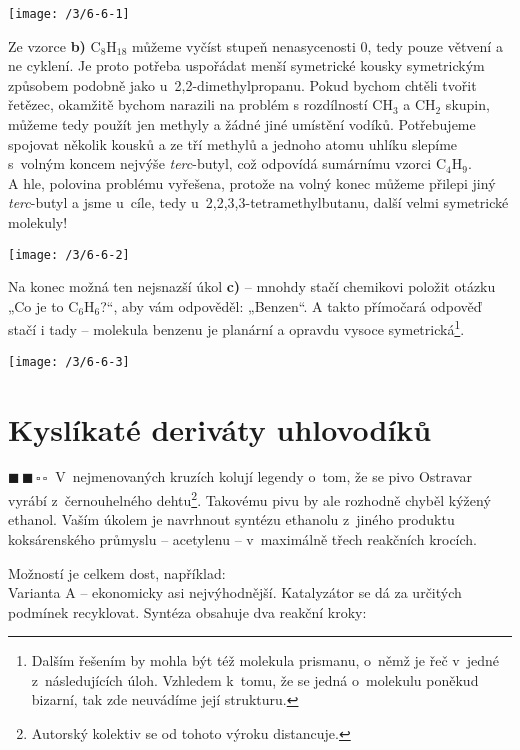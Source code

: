 \documentclass{book}
\newcommand{\dva}{$\blacksquare \, \blacksquare \, \square \, \square \; \; $}
\renewenvironment{quotation}{\par}{\par} %
\begin{document}
\begin{center}
\texttt{[image: /3/6-6-1]}
\end{center}

Ze vzorce \textbf{b)} C$_{8}$H$_{18}$ můžeme vyčíst stupeň nenasycenosti 0,
tedy pouze větvení a ne cyklení. Je proto potřeba uspořádat menší
symetrické kousky symetrickým způsobem podobně jako u~2,2-dimethylpropanu.
Pokud bychom chtěli tvořit řetězec, okamžitě bychom narazili na problém
s rozdílností CH$_{3}$ a CH$_{2}$ skupin, můžeme tedy použít jen
methyly a žádné jiné umístění vodíků. Potřebujeme spojovat několik
kousků a ze tří methylů a jednoho atomu uhlíku slepíme s~volným koncem
nejvýše \textit{terc}-butyl, což odpovídá sumárnímu vzorci C$_{4}$H$_{9}$.\\
A hle, polovina problému vyřešena, protože na volný konec můžeme přilepi
jiný \textit{terc}-butyl a jsme u~cíle, tedy u~2,2,3,3-tetramethylbutanu, další
velmi symetrické molekuly! 

\begin{center}
\texttt{[image: /3/6-6-2]}
\end{center}

Na konec možná ten nejsnazší úkol \textbf{c)} -- mnohdy stačí chemikovi položit otázku
„Co je to C$_{6}$H$_{6}$?“, aby vám odpověděl: „Benzen“. A takto
přímočará odpověď stačí i tady -- molekula benzenu je planární a
opravdu vysoce symetrická\footnote{Dalším řešením by mohla být též molekula prismanu, o~němž je řeč v~jedné z~následujících úloh. Vzhledem k~tomu, že se jedná o~molekulu poněkud bizarní, tak zde neuvádíme její strukturu.}. 

\begin{center}
\texttt{[image: /3/6-6-3]}
\end{center}

\section{Kyslíkaté deriváty uhlovodíků}

\begin{quotation}
\dva V~nejmenovaných kruzích kolují legendy o~tom, že se pivo Ostravar
vyrábí z~černouhelného dehtu\footnote{Autorský kolektiv se od tohoto výroku distancuje.}. Takovému pivu by ale rozhodně chyběl
kýžený ethanol. Vaším úkolem je navrhnout syntézu ethanolu z~jiného
produktu koksárenského průmyslu -- acetylenu -- v~maximálně třech
reakčních krocích.
\end{quotation} \dotfill \par 
Možností je celkem  dost, například:\\Varianta A -- ekonomicky asi nejvýhodnější.
Katalyzátor se dá za určitých podmínek recyklovat. Syntéza obsahuje dva reakční kroky:
\end{document}
